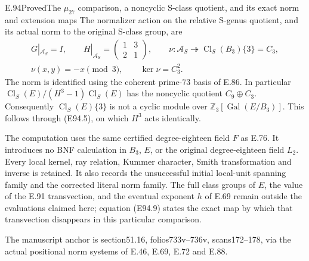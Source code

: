 \begin{statement}{E.94}{Proved}{The \(\mu_{27}\) comparison, a noncyclic S-class quotient, and its exact norm and extension maps}
The normalizer action on the relative S-genus
quotient, and its actual norm to the original
S-class group, are
\[
 \begin{gathered}
 G|_{\mathcal A_S}=I,\qquad
 H|_{\mathcal A_S}=\begin{pmatrix}1&3\\2&1\end{pmatrix},
 \qquad
 \nu:\mathcal A_S\twoheadrightarrow
      \operatorname{Cl}_S(B_3)\{3\}=C_3,\\
 \nu(x,y)=-x\pmod3,\qquad \ker\nu=C_3^2 .
 \end{gathered}
 \tag{E94.10}
\]
The norm is identified using the coherent prime-\(73\)
basis of E.86. In particular
\(\operatorname{Cl}_S(E)/(H^3-1)\operatorname{Cl}_S(E)\)
has the noncyclic quotient \(C_9\oplus C_3\).
Consequently \(\operatorname{Cl}_S(E)\{3\}\) is not
a cyclic module over
\(\mathbb Z_3[\operatorname{Gal}(E/B_3)]\).
This follows through (E94.5), on which \(H^3\)
acts identically.

The computation uses the same certified degree-eighteen
field \(F\) as E.76. It introduces no BNF calculation
in \(B_3\), \(E\), or the original degree-eighteen
field \(L_2\). Every local kernel, ray relation,
Kummer character, Smith transformation and inverse
is retained. It also records the unsuccessful initial
local-unit spanning family and the corrected literal
norm family. The full class groups of \(E\), the
value of the E.91 transvection, and the eventual
exponent \(h\) of E.69 remain outside the evaluations
claimed here; equation (E94.9) states the exact map
by which that transvection disappears in this
particular comparison.

The manuscript anchor is section51.16, folios733v--736v,
scans172--178, via the actual positional norm systems
of E.46, E.69, E.72 and E.88.
\end{statement}

